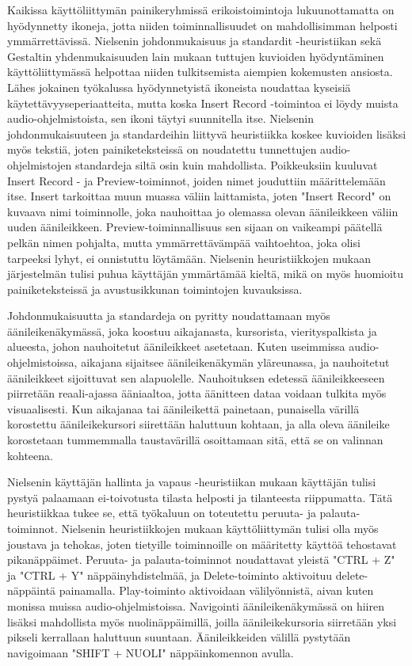 \documentclass[utf8]{gradu3}
\begin{document}
Kaikissa käyttöliittymän painikeryhmissä erikoistoimintoja lukuunottamatta on hyödynnetty ikoneja, jotta niiden toiminnallisuudet on mahdollisimman helposti ymmärrettävissä. Nielsenin johdonmukaisuus ja standardit -heuristiikan sekä Gestaltin yhdenmukaisuuden lain mukaan tuttujen kuvioiden hyödyntäminen käyttöliittymässä helpottaa niiden tulkitsemista aiempien kokemusten ansiosta. Lähes jokainen työkalussa hyödynnetyistä ikoneista noudattaa kyseisiä käytettävyyseperiaatteita, mutta koska Insert Record -toimintoa ei löydy muista audio-ohjelmistoista, sen ikoni täytyi suunnitella itse. Nielsenin johdonmukaisuuteen ja standardeihin liittyvä heuristiikka koskee kuvioiden lisäksi myös tekstiä, joten painiketeksteissä on noudatettu tunnettujen audio-ohjelmistojen standardeja siltä osin kuin mahdollista. Poikkeuksiin kuuluvat Insert Record - ja Preview-toiminnot, joiden nimet jouduttiin määrittelemään itse. Insert tarkoittaa muun muassa väliin laittamista, joten "Insert Record" on kuvaava nimi toiminnolle, joka nauhoittaa jo olemassa olevan äänileikkeen väliin uuden äänileikkeen. Preview-toiminnallisuus sen sijaan on vaikeampi päätellä pelkän nimen pohjalta, mutta ymmärrettävämpää vaihtoehtoa, joka olisi tarpeeksi lyhyt, ei onnistuttu löytämään. Nielsenin heuristiikkojen mukaan järjestelmän tulisi puhua käyttäjän ymmärtämää kieltä, mikä on myös huomioitu painiketeksteissä ja avustusikkunan toimintojen kuvauksissa.

Johdonmukaisuutta ja standardeja on pyritty noudattamaan myös äänileikenäkymässä, joka koostuu aikajanasta, kursorista, vierityspalkista ja alueesta, johon nauhoitetut äänileikkeet asetetaan. Kuten useimmissa audio-ohjelmistoissa, aikajana sijaitsee äänileikenäkymän yläreunassa, ja nauhoitetut äänileikkeet sijoittuvat sen alapuolelle. Nauhoituksen edetessä äänileikkeeseen piirretään reaali-ajassa ääniaaltoa, jotta äänitteen dataa voidaan tulkita myös visuaalisesti. Kun aikajanaa tai äänileikettä painetaan, punaisella värillä korostettu äänileikekursori siirettään haluttuun kohtaan, ja alla oleva äänileike korostetaan tummemmalla taustavärillä osoittamaan sitä, että se on valinnan kohteena.

Nielsenin käyttäjän hallinta ja vapaus -heuristiikan mukaan käyttäjän tulisi pystyä palaamaan ei-toivotusta tilasta helposti ja tilanteesta riippumatta. Tätä heuristiikkaa tukee se, että työkaluun on toteutettu peruuta- ja palauta-toiminnot. Nielsenin heuristiikkojen mukaan käyttöliittymän tulisi olla myös joustava ja tehokas, joten tietyille toiminnoille on määritetty käyttöä tehostavat pikanäppäimet. Peruuta- ja palauta-toiminnot noudattavat yleistä "CTRL + Z" ja "CTRL + Y" näppäinyhdistelmää, ja Delete-toiminto aktivoituu delete-näppäintä painamalla. Play-toiminto aktivoidaan välilyönnistä, aivan kuten monissa muissa audio-ohjelmistoissa. Navigointi äänileikenäkymässä on hiiren lisäksi mahdollista myös nuolinäppäimillä, joilla äänileikekursoria siirretään yksi pikseli kerrallaan haluttuun suuntaan. Äänileikkeiden välillä pystytään navigoimaan "SHIFT + NUOLI" näppäinkomennon avulla.
\end{document}
